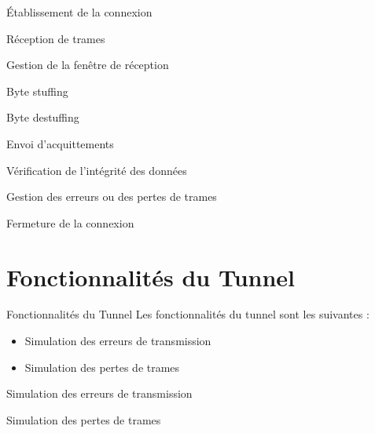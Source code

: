 \documentclass{beamer}
\begin{document}
\begin{frame}{Établissement de la connexion}
\end{frame}

\begin{frame}{Réception de trames}
\end{frame}

\begin{frame}{Gestion de la fenêtre de réception}
\end{frame}

\begin{frame}{Byte stuffing} 
\end{frame}

\begin{frame}{Byte destuffing}
\end{frame}

\begin{frame}{Envoi d'acquittements}
\end{frame}

\begin{frame}{Vérification de l'intégrité des données}
\end{frame}

\begin{frame}{Gestion des erreurs ou des pertes de trames}
\end{frame}

\begin{frame}{Fermeture de la connexion}
\end{frame}

\section{Fonctionnalités du Tunnel}
\begin{frame}{Fonctionnalités du Tunnel}
  Les fonctionnalités du tunnel sont les suivantes : 
  \begin{itemize}
    \item Simulation des erreurs de transmission
    \item Simulation des pertes de trames
  \end{itemize}
\end{frame}

\begin{frame}{Simulation des erreurs de transmission}
\end{frame}

\begin{frame}{Simulation des pertes de trames}
\end{frame}
\end{document}
